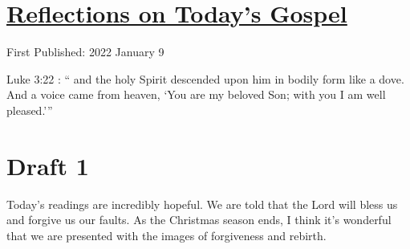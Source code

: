 \documentclass[12pt]{article}[titlepage]
\newcommand{\say}[1]{``#1''}
\newcommand{\nsay}[1]{`#1'}
\newcommand{\1}{\={a}}
\newcommand{\2}{\={e}}
\newcommand{\3}{\={\i}}
\newcommand{\4}{\=o}
\newcommand{\5}{\=u}
\newcommand{\6}{\={A}}
\renewcommand{\,}{\textsuperscript{,}}
\begin{document}
\doublespacing
\section{\href{reflections-on-readings-baptism-c-2022.html}{Reflections on Today's Gospel}}
First Published: 2022 January 9

Luke 3:22 : \say{ and the holy Spirit descended upon him in bodily form like a dove. And a voice came from heaven, \nsay{You are my beloved Son; with you I am well pleased.}}

\section{Draft 1}
Today's readings are incredibly hopeful.
We are told that the Lord will bless us and forgive us our faults.
As the Christmas season ends, I think it's wonderful that we are presented with the images of forgiveness and rebirth.
\end{document}
